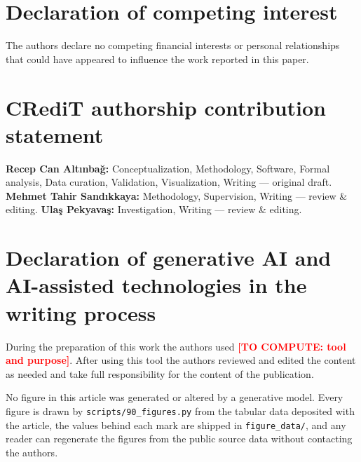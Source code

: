 \documentclass[preprint,review,12pt,authoryear]{elsarticle}
\newcommand{\pending}[1]{\textcolor{red}{\textbf{[TO COMPUTE: #1]}}}
\begin{document}
\section*{Declaration of competing interest}
The authors declare no competing financial interests or personal relationships
that could have appeared to influence the work reported in this paper.

\section*{CRediT authorship contribution statement}
\textbf{Recep Can Altınbağ:} Conceptualization, Methodology, Software,
Formal analysis, Data curation, Validation, Visualization, Writing --- original
draft. \textbf{Mehmet Tahir Sandıkkaya:} Methodology, Supervision,
Writing --- review \& editing. \textbf{Ulaş Pekyavaş:} Investigation,
Writing --- review \& editing.

\section*{Declaration of generative AI and AI-assisted technologies
in the writing process}
During the preparation of this work the authors used
\pending{tool and purpose}. After using this tool the authors reviewed and
edited the content as needed and take full responsibility for the content of
the publication.

No figure in this article was generated or altered by a generative model. Every
figure is drawn by \texttt{scripts/90\_figures.py} from the tabular data
deposited with the article, the values behind each mark are shipped in
\texttt{figure\_data/}, and any reader can regenerate the figures from the
public source data without contacting the authors.
\end{document}
